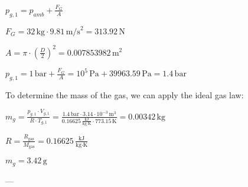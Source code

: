 \( p_{g,1} = p_{amb} + \frac{F_G}{A} \)  

\( F_G = 32 \, \text{kg} \cdot 9.81 \, \text{m/s}^2 = 313.92 \, \text{N} \)  

\( A = \pi \cdot \left(\frac{D}{2}\right)^2 = 0.007853982 \, \text{m}^2 \)  

\( p_{g,1} = 1 \, \text{bar} + \frac{F_G}{A} = 10^5 \, \text{Pa} + 39963.59 \, \text{Pa} = 1.4 \, \text{bar} \)  

To determine the mass of the gas, we can apply the ideal gas law:  

\( m_g = \frac{p_{g,1} \cdot V_{g,1}}{R \cdot T_{g,1}} = \frac{1.4 \, \text{bar} \cdot 3.14 \cdot 10^{-3} \, \text{m}^3}{0.16625 \, \frac{\text{kJ}}{\text{kg·K}} \cdot 773.15 \, \text{K}} = 0.00342 \, \text{kg} \)  

\( R = \frac{R_{\text{gas}}}{M_{\text{gas}}} = 0.16625 \, \frac{\text{kJ}}{\text{kg·K}} \)  

\( m_g = 3.42 \, \text{g} \)  

---
